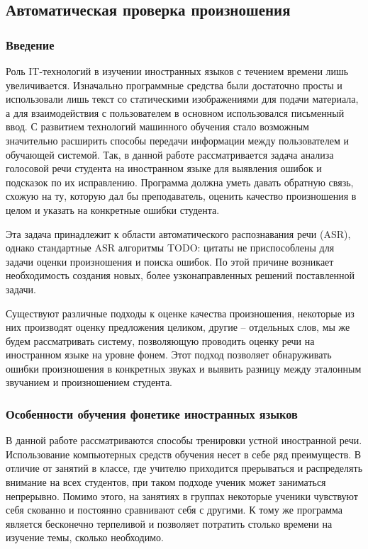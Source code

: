 \subsection{Автоматическая проверка произношения}

\subsubsection{Введение}
Роль IT-технологий в изучении иностранных языков с течением времени лишь увеличивается. Изначально программные средства были достаточно просты и использовали лишь текст со статическими изображениями для подачи материала, а для взаимодействия с пользователем в основном использовался письменный ввод. С развитием технологий машинного обучения стало возможным значительно расширить способы передачи информации между пользователем и обучающей системой. Так, в данной работе рассматривается задача анализа голосовой речи студента на иностранном языке для выявления ошибок и подсказок по их исправлению. Программа должна уметь давать обратную связь, схожую на ту, которую дал бы преподаватель, оценить качество произношения в целом и указать на конкретные ошибки студента.

Эта задача принадлежит к области автоматического распознавания речи (ASR), однако стандартные ASR алгоритмы {\color{red}TODO: цитаты} не приспособлены для задачи оценки произношения и поиска ошибок. По этой причине возникает необходимость создания новых, более узконаправленных решений поставленной задачи.

Существуют различные подходы к оценке качества произношения, некоторые из них производят оценку предложения целиком, другие -- отдельных слов, мы же будем рассматривать систему, позволяющую проводить оценку речи на иностранном языке на уровне фонем. Этот подход позволяет обнаруживать ошибки произношения в конкретных звуках и выявить разницу между эталонным звучанием и произношением студента.

\subsubsection{Особенности обучения фонетике иностранных языков}
В данной работе рассматриваются способы тренировки устной иностранной речи. Использование компьютерных средств обучения несет в себе ряд преимуществ. В отличие от занятий в классе, где учителю приходится прерываться и распределять внимание на всех студентов, при таком подходе ученик может заниматься непрерывно. Помимо этого, на занятиях в группах некоторые ученики чувствуют себя скованно и постоянно сравнивают себя с другими. К тому же программа является бесконечно терпеливой и позволяет потратить столько времени на изучение темы, сколько необходимо.

